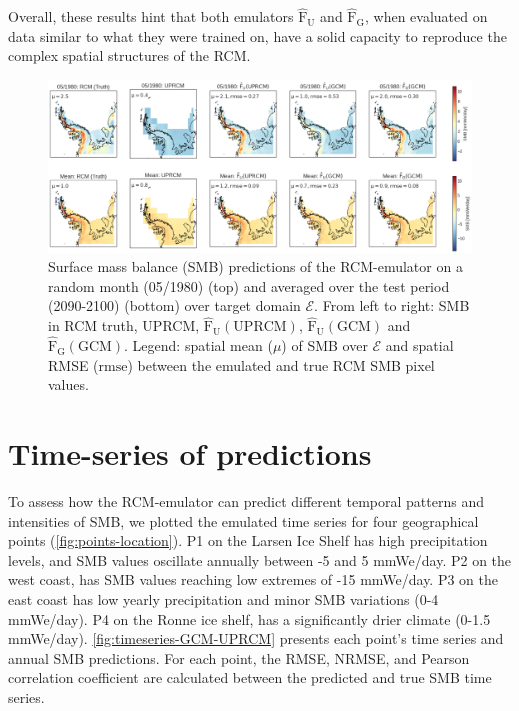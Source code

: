 \documentclass[a4paper,11pt,oneside]{report}
\begin{document}
Overall, these results hint that both emulators $\mathrm{\hat{F}_{U}}$ and $\mathrm{\hat{F}_{G}}$, when evaluated on data similar to what they were trained on, have a solid capacity to reproduce the complex spatial structures of the RCM. 



\begin{figure}[thb]
  \centering
  \includegraphics[width=\columnwidth]{doc/Thesis-latex/images/results/geoplots_RCM_GCM.pdf}
  \caption []{\small Surface mass balance (SMB) predictions of the RCM-emulator on a random month (05/1980) (top) and averaged over the test period (2090-2100) (bottom) over target domain $\mathcal{E}$. From left to right: SMB in RCM truth, UPRCM, $\mathrm{\hat{F}_{U}(UPRCM)}$, $\mathrm{\hat{F}_{U}(GCM)}$ and $\mathrm{\hat{F}_{G}(GCM)}$. Legend: spatial mean ($\mu$) of SMB over $\mathcal{E}$ and spatial RMSE ($\mathrm{rmse}$) between the emulated and true RCM SMB pixel values.}
  \vspace{-3mm}
  \label{fig:geoplots-GCM-RCM}
\end{figure}

\section{Time-series of predictions}\label{sec:res-time-series}
To assess how the RCM-emulator can predict different temporal patterns and intensities of SMB, we plotted the emulated time series for four geographical points (\autoref{fig:points-location}). P1 on the Larsen Ice Shelf has high precipitation levels, and SMB values oscillate annually between -5 and 5 \si{mmWe/day}. P2 on the west coast, has SMB values reaching low extremes of -15 \si{mmWe/day}. P3 on the east coast has low yearly precipitation and minor SMB variations (0-4 \si{mmWe/day}). P4 on the Ronne ice shelf, has a significantly drier climate (0-1.5 \si{mmWe/day}). \autoref{fig:timeseries-GCM-UPRCM} presents each point's time series and annual SMB predictions. For each point, the RMSE, NRMSE, and Pearson correlation coefficient are calculated between the predicted and true SMB time series. 
\end{document}

